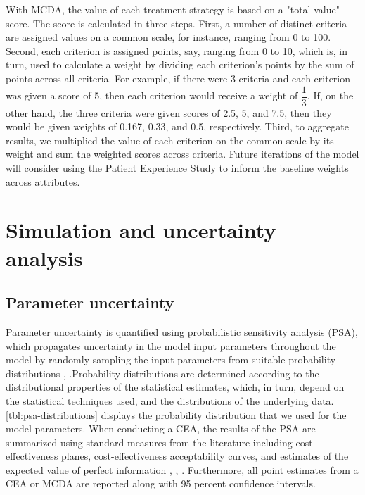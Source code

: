 \documentclass[11pt,final,fleqn]{article}\usepackage[]{graphicx}\usepackage[]{color}
\theoremstyle{plain}
\begin{document}
{With MCDA, the value of each treatment strategy is based on a "total value" score. The score is calculated in three steps. First, a number of distinct criteria are assigned values on a common scale, for instance, ranging from 0 to 100. Second, each criterion is assigned points, say, ranging from 0 to 10, which is, in turn, used to calculate a weight by dividing each criterion's points by the sum of points across all criteria. For example, if there were 3 criteria and each criterion was given a score of 5, then each criterion would receive a weight of $ \dfrac{1}{3} $. If, on the other hand, the three criteria were given scores of 2.5, 5, and 7.5, then they would be given weights of 0.167, 0.33, and 0.5, respectively. Third, to aggregate results, we multiplied the value of each criterion on the common scale by its weight and sum the weighted scores across criteria. Future iterations of the model will consider using the Patient Experience Study to inform the baseline weights across attributes. 


\section{Simulation and uncertainty analysis}\label{sec:uncertainty-analysis}

\subsection{Parameter uncertainty} \label{subsec:psa}
Parameter uncertainty is quantified using probabilistic sensitivity analysis (PSA), which propagates uncertainty in the model input parameters throughout the model by randomly sampling the input parameters from suitable probability distributions \citep{baio2015probabilistic}, \citep{claxton2005probabilistic}.Probability distributions are determined according to the distributional properties of the statistical estimates, which, in turn, depend on the statistical techniques used, and the distributions of the underlying data. \autoref{tbl:psa-distributions} displays the probability distribution that we used for the model parameters. When conducting a CEA, the results of the PSA are summarized using standard measures from the literature including cost-effectiveness planes, cost-effectiveness acceptability curves, and estimates of the expected value of perfect information \citep{black1990plane}, \citep{van1994costs}, \citep{briggs1999bayesian}. Furthermore, all point estimates from a CEA or MCDA are reported along with 95 percent confidence intervals. 

}
\end{document}
